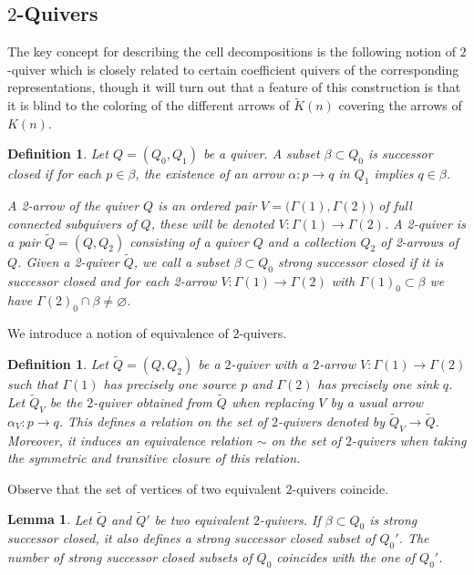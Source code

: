 \documentclass{amsart}
\newtheorem{definition}[theorem]{Definition}
\newtheorem{lemma}[theorem]{Lemma}
\numberwithin{equation}{section}
\begin{document}
\subsection{$2$-Quivers}

The key concept for describing the cell decompositions is the following notion of $2$-quiver which is closely related to certain coefficient quivers of the corresponding representations, though it will turn out that a feature of this construction is that it is blind to the coloring of the different arrows of $\widetilde K(n)$ covering the arrows of $K(n)$.
\begin{definition}
  Let $Q=(Q_0,Q_1)$ be a quiver.
  A subset $\beta\subset Q_0$ is \emph{successor closed} if for each $p\in\beta$, the existence of an arrow $\alpha:p\to q$ in $Q_1$ implies $q\in\beta$.

  A \emph{2-arrow} of the quiver $Q$ is an ordered pair $V=\big(\Gamma(1),\Gamma(2)\big)$ of full connected subquivers of $Q$, these will be denoted $V:\Gamma(1)\to\Gamma(2)$.
  A \emph{2-quiver} is a pair $\tilde Q=(Q,Q_2)$ consisting of a quiver $Q$ and a collection $Q_2$ of 2-arrows of $Q$.
  Given a 2-quiver $\tilde Q$, we call a subset $\beta\subset Q_0$ \emph{strong successor closed} if it is successor closed and for each 2-arrow $V:\Gamma(1)\to\Gamma(2)$ with $\Gamma(1)_0\subset\beta$ we have $\Gamma(2)_0\cap\beta\ne\varnothing$.  

\end{definition}
We introduce a notion of equivalence of $2$-quivers.
\begin{definition}\label{def:2equivalence}
Let $\tilde Q=(Q,Q_2)$ be a $2$-quiver with a $2$-arrow $V:\Gamma(1)\to\Gamma(2)$ such that $\Gamma(1)$ has precisely one source $p$ and $\Gamma(2)$ has precisely one sink $q$. Let $\tilde Q_V$ be the $2$-quiver obtained from $\tilde Q$ when replacing $V$ by a usual arrow $\alpha_V:p\to q$. This defines a relation on the set of $2$-quivers denoted by $\tilde Q_V\to \tilde Q$. Moreover, it induces an equivalence relation $\sim$ on the set of $2$-quivers when taking the symmetric and transitive closure of this relation. 
\end{definition}
Observe that the set of vertices of two equivalent $2$-quivers coincide.
\begin{lemma}\label{lem:2equivalence}
Let $\tilde Q$ and $\tilde Q'$ be two equivalent $2$-quivers. If $\beta\subset Q_0$ is strong successor closed, it also defines a strong successor closed subset of $Q_0'$.
The number of strong successor closed subsets of $Q_0$ coincides with the one of $ Q_0'$.
\end{lemma}
\end{document}
